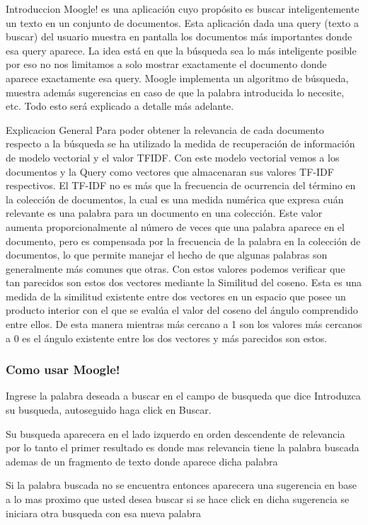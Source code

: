 \documentclass{beamer}
\begin{document}
\begin{frame}{Introduccion}
	Moogle! es una aplicación cuyo propósito es buscar inteligentemente un texto en un conjunto de documentos. Esta aplicación dada una query (texto a buscar) del usuario muestra en pantalla los documentos más importantes donde esa query aparece. La idea está en que la búsqueda sea lo más inteligente posible por eso no nos limitamos a solo mostrar exactamente el documento donde aparece exactamente esa query. Moogle implementa un algoritmo de búsqueda, muestra además sugerencias en caso de que la palabra introducida lo necesite, etc. Todo esto será explicado a detalle más adelante.
\end{frame}

\begin{frame}{Explicacion General}
	Para poder obtener la relevancia de cada documento respecto a la búsqueda se ha utilizado la medida de recuperación de información de modelo vectorial y el valor TFIDF. Con este modelo vectorial vemos a los documentos y la Query como vectores que almacenaran sus valores TF-IDF respectivos. El TF-IDF no es más que la frecuencia de ocurrencia del término en la colección de documentos, la cual es una medida numérica que expresa cuán relevante es una palabra para un documento en una colección. Este valor aumenta proporcionalmente al número de veces que una palabra aparece en el documento, pero es compensada por la frecuencia de la palabra en la colección de documentos, lo que permite manejar el hecho de que algunas palabras son generalmente más comunes que otras. Con estos valores podemos verificar que tan parecidos son estos dos vectores mediante la Similitud del coseno. Esta es una medida de la similitud existente entre dos vectores en un espacio que posee un producto interior con el que se evalúa el valor del coseno del ángulo comprendido entre ellos. De esta manera mientras más cercano a 1 son los valores más cercanos a 0 es el ángulo existente entre los dos vectores y más parecidos son estos.
\end{frame}

\begin{frame}
\frametitle{Como usar Moogle!}
\begin{block}{1}
	Ingrese la palabra deseada a buscar en el campo de busqueda que dice Introduzca su busqueda, autoseguido haga click en Buscar.
\end{block}

\begin{block}{2}
	Su busqueda aparecera en el lado izquerdo en orden descendente de relevancia por lo tanto el primer resultado es donde mas relevancia tiene la palabra buscada ademas de un fragmento de texto donde aparece dicha palabra
\end{block}

\begin{block}{3}
	Si la palabra buscada no se encuentra entonces aparecera una sugerencia en base a lo mas proximo que usted desea buscar si se hace click en dicha sugerencia se iniciara otra busqueda con esa nueva palabra
\end{block}
\end{frame}
\end{document}
